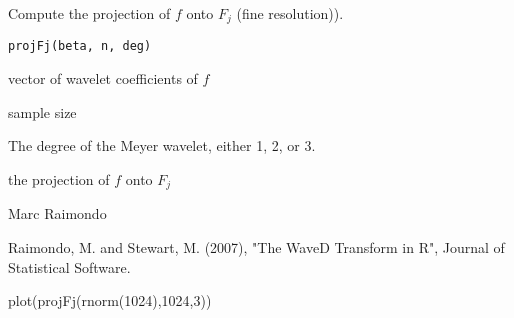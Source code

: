 \begin{Description}\relax
Compute the projection of $f$ onto $F_j$ (fine resolution)).
\end{Description}
\begin{Usage}
\begin{verbatim}
projFj(beta, n, deg)
\end{verbatim}
\end{Usage}
\begin{Arguments}
\begin{ldescription}
\item[\code{beta}] vector of wavelet coefficients of $f$
\item[\code{n}] sample size
\item[\code{deg}] The degree of the Meyer wavelet, either 1, 2, or 3.
\end{ldescription}
\end{Arguments}
\begin{Value}
the projection of $f$ onto $F_j$
\end{Value}
\begin{Author}\relax
Marc Raimondo
\end{Author}
\begin{References}\relax
Raimondo, M. and Stewart, M. (2007),
"The WaveD Transform in R", Journal of Statistical Software.
\end{References}
\begin{SeeAlso}\relax
{}
\end{SeeAlso}
\begin{Examples}
\begin{ExampleCode}
 plot(projFj(rnorm(1024),1024,3))
\end{ExampleCode}
\end{Examples}

